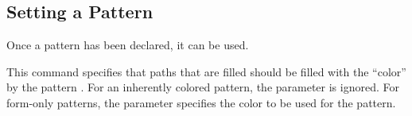\subsection{Setting a Pattern}

Once a pattern has been declared, it can be used.

\begin{command}{\pgfsetfillpattern{}}
  This command specifies that paths that are filled should be filled
  with the ``color'' by the pattern . For an inherently
  colored pattern, the  parameter is ignored. For
  form-only patterns, the  parameter specifies the color
  to be used for the pattern.
\begin{codeexample}[]
\end{codeexample}
\end{command}



